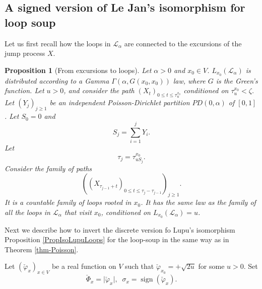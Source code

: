 \documentclass[11pt,a4paper]{amsart}
\numberwithin{equation}{section}
\newtheorem{proposition}{Proposition}[section]
\begin{document}
\subsection{A signed version of Le Jan's isomorphism for loop soup}
\label{sec:lejaninv}
Let us first recall how the loops in $\mathcal{L}_{\alpha}$ are connected to the excursions of the jump process $X$.
\begin{proposition}[From excursions to loops]
\label{PropPD}
Let $\alpha>0$ and $x_{0}\in V$. 
$L_{x_{0}}(\mathcal{L}_{\alpha})$ is distributed according to a Gamma
$\Gamma(\alpha, G(x_{0},x_{0}))$ law, where $G$ is the Green's function. Let $u>0$, and consider the path $(X_{t})_{0\leq t\leq \tau_{u}^{x_{0}}}$ conditioned on $\tau_{u}^{x_{0}}<\zeta$. Let $(Y_{j})_{j\geq 1}$ be an independent Poisson-Dirichlet partition $PD(0,\alpha)$ of $[0,1]$. Let $S_{0}=0$ and
\begin{displaymath}
S_{j}=\sum_{i=1}^{j}Y_{i}.
\end{displaymath}
Let
\begin{displaymath}
\tau_{j}= \tau_{u S_{j}}^{x_{0}}.
\end{displaymath}
Consider the family of paths
\begin{displaymath}
\left((X_{\tau_{j-1}+t})_{0\leq t\leq \tau_{j}-\tau_{j-1}}\right)_{j\geq 1}.
\end{displaymath}
It is a countable family of loops rooted in $x_{0}$. It has the same law as the family of all the loops in $\mathcal{L}_{\alpha}$ that visit $x_{0}$, conditioned on $L_{x_0}(\mathcal{L}_{\alpha})=u$.
\end{proposition}


Next we describe how to invert the discrete version fo Lupu's isomorphism Proposition \ref{PropIsoLupuLoops} for the loop-soup in the same way as in Theorem \ref{thm-Poisson}.

Let $(\check \varphi_x)_{x\in V}$ be a real function on $V$ such that
$\check\varphi_{x_0}=+\sqrt{2u}$ for some $u>0$. Set 
$$
\check \Phi_x=\vert\check\varphi_x\vert, \;\;\sigma_x=\operatorname{sign}(\check\varphi_x).
$$
\end{document}

